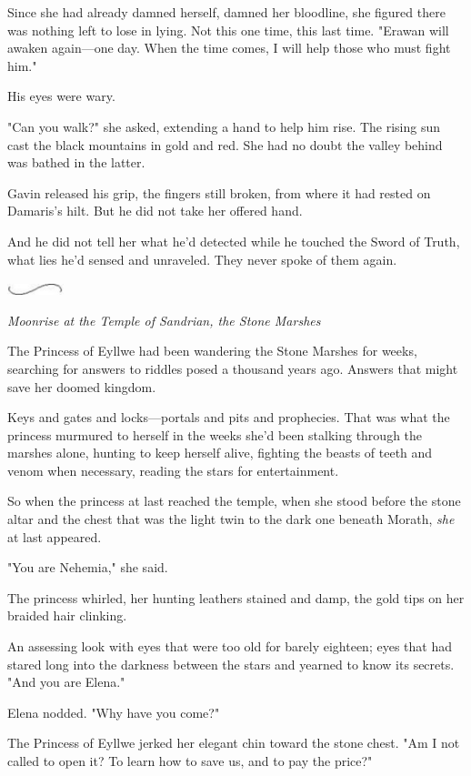 Since she had already damned herself, damned her bloodline, she figured there was nothing left to lose in lying. Not this one time, this last time. "Erawan will awaken again---one day. When the time comes, I will help those who must fight him."

His eyes were wary.

"Can you walk?" she asked, extending a hand to help him rise. The rising sun cast the black mountains in gold and red. She had no doubt the valley behind was bathed in the latter.

Gavin released his grip, the fingers still broken, from where it had rested on Damaris's hilt. But he did not take her offered hand.

And he did not tell her what he'd detected while he touched the Sword of Truth, what lies he'd sensed and unraveled. They never spoke of them again.

\includegraphics[width=0.65in,height=0.13in]{images/seperator}

\emph{Moonrise at the Temple of Sandrian, the Stone Marshes}

The Princess of Eyllwe had been wandering the Stone Marshes for weeks, searching for answers to riddles posed a thousand years ago. Answers that might save her doomed kingdom.

Keys and gates and locks---portals and pits and prophecies. That was what the princess murmured to herself in the weeks she'd been stalking through the marshes alone, hunting to keep herself alive, fighting the beasts of teeth and venom when necessary, reading the stars for entertainment.

So when the princess at last reached the temple, when she stood before the stone altar and the chest that was the light twin to the dark one beneath Morath, \emph{she} at last appeared.

"You are Nehemia," she said.

The princess whirled, her hunting leathers stained and damp, the gold tips on her braided hair clinking.

An assessing look with eyes that were too old for barely eighteen; eyes that had stared long into the darkness between the stars and yearned to know its secrets. "And you are Elena."

Elena nodded. "Why have you come?"

The Princess of Eyllwe jerked her elegant chin toward the stone chest. "Am I not called to open it? To learn how to save us, and to pay the price?"

